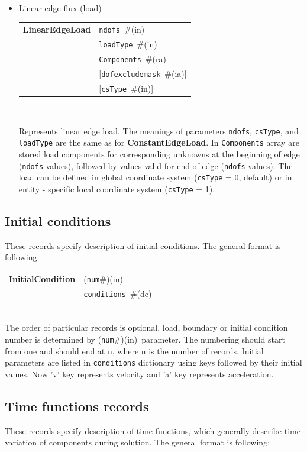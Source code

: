 \documentclass[a4paper]{article}
\makeatletter
\newcommand{\param}[1]{\texttt{#1}} %
\newcommand{\optional}[1]{[#1]} %
\newcommand{\field}[2]{\param{#1}~\#{\tiny(#2)}} %
\newcommand{\optField}[2]{\optional{\field{#1}{#2}}}
\newcommand{\componentNum}{(\param{num}\#){\tiny(in)}} %
\newcommand{\entKeywordInst}[1]{\textbf{#1}} %
\newenvironment{record}[1][]{\begin{tabular}{|ll}}{\end{tabular}\\}
\newcommand{\recentry}[2]{{#1}&{#2}\\}
\newcounter{rcc}
\newenvironment{record}[1][\textwidth]{\setcounter{rcc}{0}\begin{tabular*}{#1}{|ll@{\extracolsep{\fill}}r}}{\end{tabular*}\\}
\newcommand{\recentry}[2]{\ifthenelse{\value{rcc}>0}{&$\backslash$ \\}{\setcounter{rcc}{1}}{#1}&{#2}}
\makeatother
\begin{document}
\begin{itemize}
The load can be defined in global coordinate system (\param{csType} =
0, default) or in entity - specific local coordinate system
(\param{csType} = 1).
\item Linear edge flux (load)

\begin{record}[0.9\textwidth]
  \recentry{\entKeywordInst{LinearEdgeLoad}}{\field{ndofs}{in}}
  \recentry{}{\field{loadType}{in}}
  \recentry{}{\field{Components}{ra}}
  \recentry{}{\optField{dofexcludemask}{ia}}
  \recentry{}{\optField{csType}{in}}
\end{record}

Represents linear edge load. The meanings of parameters \param{ndofs},
\param{csType}, and \param{loadType} are the same as for
\entKeywordInst{ConstantEdgeLoad}. In \param{Components}
array are stored load components for corresponding unknowns at the
beginning of edge (\param{ndofs} values), followed by values valid for
end of edge (\param{ndofs} values). The load can be defined in global coordinate system (\param{csType} =
0, default) or in entity - specific local coordinate system
(\param{csType} = 1).
\end{itemize}


\subsection{Initial conditions}
\label{_InitialConditions}
These records specify description of initial conditions. The general format is
following:

\noindent
\begin{record}
  \recentry{\entKeywordInst{InitialCondition}}{\componentNum}
  \recentry{}{\field{conditions}{dc}}
\end{record}
The order of particular  records is optional, load, boundary or initial condition number is determined by \componentNum\ parameter.
The numbering should start from one and should end at n, where n is the number of records.
Initial parameters are listed in \param{conditions} dictionary using keys followed by their initial values.
Now 'v' key represents velocity and 'a' key represents acceleration.



\subsection{Time functions records}
\label{_TimeFunctionsRecords}
These records specify description of time functions, which generally describe
time variation of components during solution. The  general format is
following:
\end{document}
